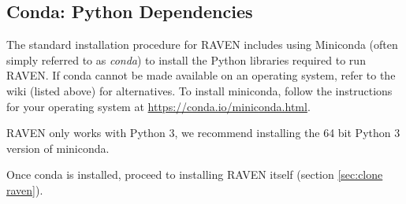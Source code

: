 \subsection{Conda: Python Dependencies}
\label{sec:install conda}

The standard installation procedure for RAVEN includes using Miniconda (often simply referred to as
\emph{conda}) to install the Python libraries required to run RAVEN.  If conda cannot be made available on an
operating system, refer to the wiki (listed above) for alternatives.  To install miniconda, follow the
instructions for your operating system at \url{https://conda.io/miniconda.html}.

\nb RAVEN only works with Python 3, we recommend installing the 64 bit Python 3 version of miniconda.

Once conda is installed, proceed to installing RAVEN itself (section \ref{sec:clone raven}).
